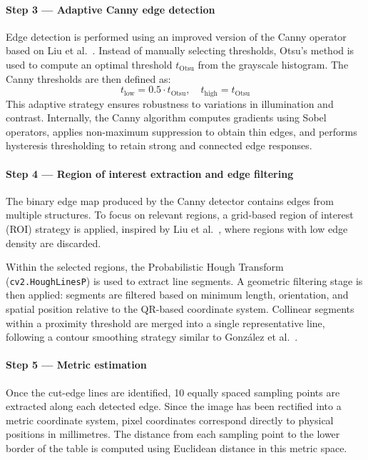 \documentclass[11pt]{article}
\begin{document}
\paragraph{Step 3 --- Adaptive Canny edge detection}
Edge detection is performed using an improved version of the Canny operator based on Liu et al.~\cite{Liu2024b}. Instead of manually selecting thresholds, Otsu’s method is used to compute an optimal threshold $t_{\text{Otsu}}$ from the grayscale histogram. The Canny thresholds are then defined as:
\[
t_{\text{low}} = 0.5 \cdot t_{\text{Otsu}}, \quad t_{\text{high}} = t_{\text{Otsu}}
\]
This adaptive strategy ensures robustness to variations in illumination and contrast. Internally, the Canny algorithm computes gradients using Sobel operators, applies non-maximum suppression to obtain thin edges, and performs hysteresis thresholding to retain strong and connected edge responses.

\paragraph{Step 4 --- Region of interest extraction and edge filtering}
The binary edge map produced by the Canny detector contains edges from multiple structures. To focus on relevant regions, a grid-based region of interest (ROI) strategy is applied, inspired by Liu et al.~\cite{Liu2024a}, where regions with low edge density are discarded.

Within the selected regions, the Probabilistic Hough Transform (\texttt{cv2.HoughLinesP}) is used to extract line segments. A geometric filtering stage is then applied: segments are filtered based on minimum length, orientation, and spatial position relative to the QR-based coordinate system. Collinear segments within a proximity threshold are merged into a single representative line, following a contour smoothing strategy similar to González et al.~\cite{Gonzalez2024}.

\paragraph{Step 5 --- Metric estimation}
Once the cut-edge lines are identified, 10 equally spaced sampling points are extracted along each detected edge. Since the image has been rectified into a metric coordinate system, pixel coordinates correspond directly to physical positions in millimetres. The distance from each sampling point to the lower border of the table is computed using Euclidean distance in this metric space.
\end{document}
